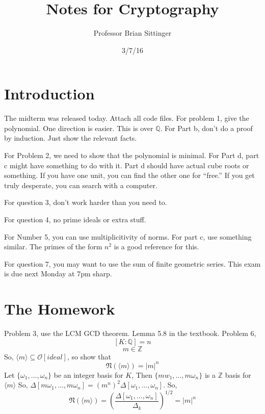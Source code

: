 \documentclass{article}
\title{Notes for Cryptography}
\author{Professor Brian Sittinger}
\date{3/7/16}
\begin{document}
\maketitle
\section{Introduction}
The midterm was released today. Attach all code files. For problem 1, give the
polynomial. One direction is easier. This is over $\mathbb{Q}$. For Part b,
don't do a proof by induction. Just show the relevant facts. 

For Problem 2, we need to show that the polynomial is minimal. For Part d, part
c might have something to do with it. Part d should have actual cube roots or
something. If you have one unit, you can find the other one for ``free.'' If you
get truly desperate, you can search with a computer. 

For question 3, don't work harder than you need to. 

For question 4, no prime ideals or extra stuff. 

For Number 5, you can use multiplicitivity of norms. For part c, use something
similar. The primes of the form $n^2$ is a good reference for this.

For question 7, you may want to use the sum of finite geometric series. This
exam is due next Monday at 7pm sharp.   
\section*{The Homework}
Problem 3, use the LCM GCD theorem. Lemma 5.8 in the textbook. Problem 6, 
\[ [K:\mathbb{Q}] = n\]
\[ m \in \mathbb{Z} \]
So, $\langle m \rangle \subseteq \mathcal{O}[ideal]$, so show that 
\[ \mathfrak{N}(\langle m \rangle) = |m|^n \]
Let $\{\omega_1, \ldots, \omega_n\}$ be an integer basis for $K$, Then $\{mw_1,
\ldots, m\omega_n\}$ is a $\mathbb{Z}$ basis for $\langle m \rangle$ So,
$\Delta[m\omega_1, \ldots, m\omega_n] = (m^n)^2 \Delta[\omega_1, \ldots,
\omega_n]$. So, 
\[ \mathfrak{N}(\langle m \rangle) = \left( \frac{\Delta[\omega_1, \ldots,
\omega_n]}{\Delta_k}\right)^{1/2} = |m|^n \]
\end{document}
